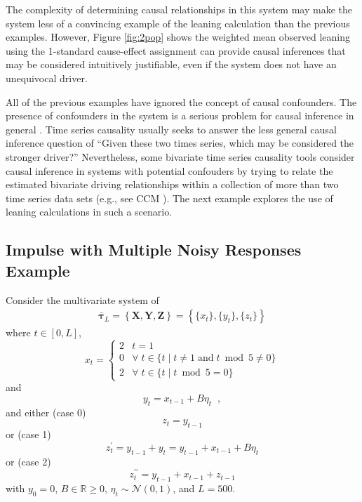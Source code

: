 \documentclass[twocolumn,aps,pre,groupedaddress]{revtex4-1}
\begin{document}
The complexity of determining causal relationships in this system may make the system less of a convincing example of the leaning calculation than the previous examples.  However, Figure \ref{fig:2pop} shows the weighted mean observed leaning using the 1-standard cause-effect assignment can provide causal inferences that may be considered intuitively justifiable, even if the system does not have an unequivocal driver. 

All of the previous examples have ignored the concept of causal confounders.  The presence of confounders in the system is a serious problem for causal inference in general \cite{Rubin2015,Pearl2000}.  Time series causality usually seeks to answer the less general causal inference question of ``Given these two times series, which may be considered the stronger driver?'' Nevertheless, some bivariate time series causality tools consider causal inference in systems with potential confouders by trying to relate the estimated bivariate driving relationships within a collection of more than two time series data sets (e.g., see CCM \cite{Sugihara2012}).  The next example explores the use of leaning calculations in such a scenario.

\subsection{Impulse with Multiple Noisy Responses Example}
Consider the multivariate system of
\begin{eqnarray}
\label{eqn:3var}
\bar{\mathbf{\tau}}_L = \left\{\mathbf{X},\mathbf{Y},\mathbf{Z}\right\} = \left\{\{x_t\},\{y_t\},\{z_t\}\right\}
\end{eqnarray}
where $t\in[0,L]$,
\begin{equation*}
x_t = \left\{
  \begin{array}{lr}
    2 & t = 1\\
    0 & \forall\; t\in\{t\;|\;t\neq 1 \;\mathrm{and}\; t\bmod 5 \neq 0\}\\
    2 & \forall\; t\in\{t\;|\;t\bmod 5 = 0\}
  \end{array}
\right.
\end{equation*}
and
\begin{equation*}
y_t = x_{t-1} + B\eta_t\;\;,
\end{equation*}
and either (case 0)
\begin{equation}
z_t = y_{t-1}
\end{equation}
or (case 1)
\begin{equation}
z_t^\prime = y_{t-1} + y_t = y_{t-1} + x_{t-1} + B\eta_t
\end{equation}
or (case 2)
\begin{equation}
z_t^{\prime\prime} = y_{t-1} + x_{t-1} + z_{t-1}
\end{equation}
with $y_0 = 0$, $B\in\mathbb{R}\ge 0$, $\eta_t\sim\mathcal{N}\left(0,1\right)$, and $L=500$.
\end{document}
